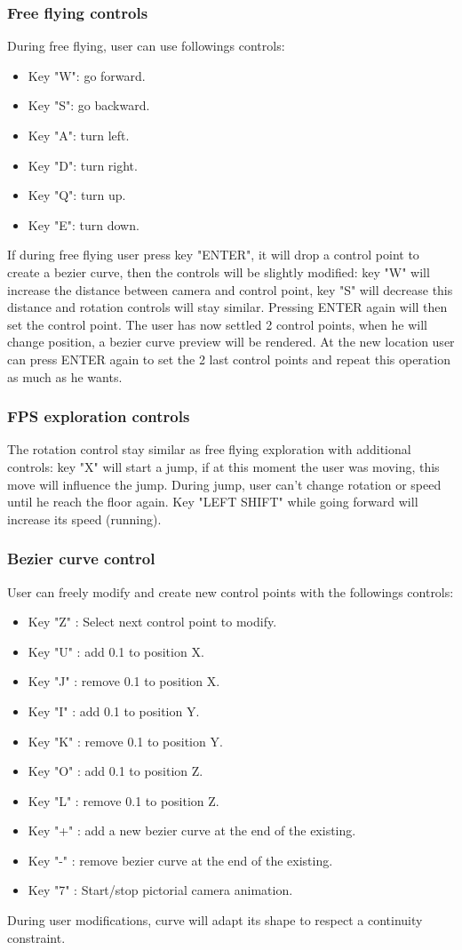 \documentclass[a4paper,11pt]{article}
\begin{document}
\subsubsection{Free flying controls}
During free flying, user can use followings controls:
\begin{itemize}
\item Key "W": go forward.
\item Key "S": go backward.
\item Key "A": turn left.
\item Key "D": turn right.
\item Key "Q": turn up.
\item Key "E": turn down.
\end{itemize}
If during free flying user press key "ENTER", it will drop a control point to create a bezier curve, then the controls will be slightly modified: key "W" will increase the distance between camera and control point, key "S" will decrease this distance and rotation controls will stay similar. Pressing ENTER again will then set the control point. The user has now settled 2 control points, when he will change position, a bezier curve preview will be rendered. At the new location user can press ENTER again to set the 2 last control points and repeat this operation as much as he wants.

\subsubsection{FPS exploration controls}
The rotation control stay similar as free flying exploration with additional controls: key "X" will start a jump, if at this moment the user was moving, this move will influence the jump. During jump, user can't change rotation or speed until he reach the floor again.  Key "LEFT SHIFT" while going forward will increase its speed (running).

\subsubsection{Bezier curve control}
User can freely modify and create new control points with the followings controls:  
\begin{itemize}
\item Key "Z" : Select next control point to modify.
\item Key "U" : add 0.1 to position X.
\item Key "J" : remove 0.1 to position X.
\item Key "I" : add 0.1 to position Y.
\item Key "K" : remove 0.1 to position Y.
\item Key "O" : add 0.1 to position Z.
\item Key "L" : remove 0.1 to position Z.
\item Key "+" : add a new bezier curve at the end of the existing.
\item Key "-" : remove bezier curve at the end of the existing.
\item Key "7" : Start/stop pictorial camera animation.
\end{itemize}
During user modifications, curve will adapt its shape to respect a continuity constraint.
\end{document}
